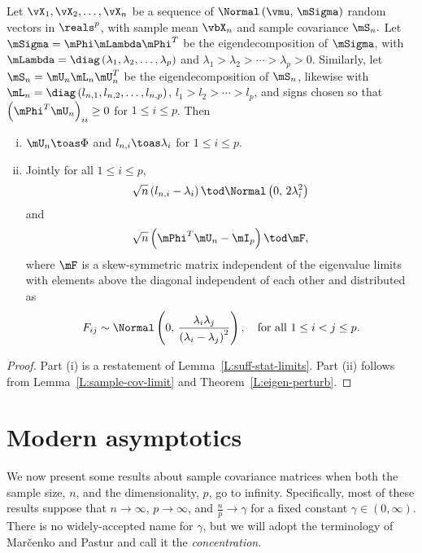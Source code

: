 \begin{theorem}
Let $\vX_1, \vX_2, \ldots, \vX_n$ be a sequence of \iid 
\(
    \Normal \left(
        \vmu, \,
        \mSigma
    \right)
\)
random vectors in $\reals^p$, with sample mean
\(
    \vbX_n
\)
and sample covariance
\(
    \mS_n.
\)
Let $\mSigma = \mPhi \mLambda \mPhi^T$ be the eigendecomposition
of $\mSigma$, with
\(
    \mLambda = \diag \left(
        \lambda_1,
        \lambda_2,
        \ldots,
        \lambda_p
    \right)
\)
and
\(
    \lambda_1 > \lambda_2 > \cdots > \lambda_p > 0
\).
Similarly, let $\mS_n = \mU_n \mL_n \mU_n^T$ be the eigendecomposition of $\mS_n$, likewise with
\(
    \mL_n = \diag \left(
        l_{n,1},
        l_{n,2},
        \ldots,
        l_{n,p}
    \right)
\),
\(
    l_1 > l_2 > \cdots > l_p
\),
and signs chosen so that
\(
    \left( \mPhi^T \mU_n \right)_{ii} \geq 0
\)
for $1 \leq i \leq p$.  Then
\begin{enumerate}[(i)]
    \item $\mU_n \toas \Phi$ and $l_{n,i} \toas \lambda_i$ for
        $1 \leq i \leq p$.
    \item Jointly for all $1 \leq i \leq p$,
        \[
            \sqrt{n} \left( l_{n,i} - \lambda_i \right) 
            \tod 
            \Normal\left( 0, \, 2 \lambda_i^2 \right)
        \]
        and
        \[
            \sqrt{n} \left( \mPhi^T \mU_n - \mI_p \right) \tod \mF,
        \]
        where $\mF$ is a skew-symmetric matrix independent of the
        eigenvalue limits with elements above the diagonal independent of
        each other and distributed as 
        \[
            F_{ij}
            \sim
            \Normal \left(
                0, \,
                \frac{\lambda_i \lambda_j}
                     {\left( \lambda_i - \lambda_j \right)^2}
            \right),
            \quad
            \text{for all $1 \leq i < j \leq p$.}
        \]
\end{enumerate}
\end{theorem}
\begin{proof}
Part (i) is a restatement of Lemma~\ref{L:suff-stat-limits}.  Part (ii) follows from Lemma~\ref{L:sample-cov-limit} and Theorem~\ref{L:eigen-perturb}.
\end{proof}


\section{Modern asymptotics}\label{S:multivariate-modern}

We now present some results about sample covariance matrices when both the sample size, $n$, and the dimensionality, $p$, go to infinity.  Specifically, most of these results suppose that $n \to \infty$, $p \to \infty$, and 
\(
    \frac{n}{p} \to \gamma
\)
for a fixed constant
\(
    \gamma \in \left( 0, \infty \right).
\)
There is no widely-accepted name for $\gamma$, but we will adopt the terminology of Mar\v{c}enko and Pastur \cite{marcenko1967des} and call it the \emph{concentration}.

